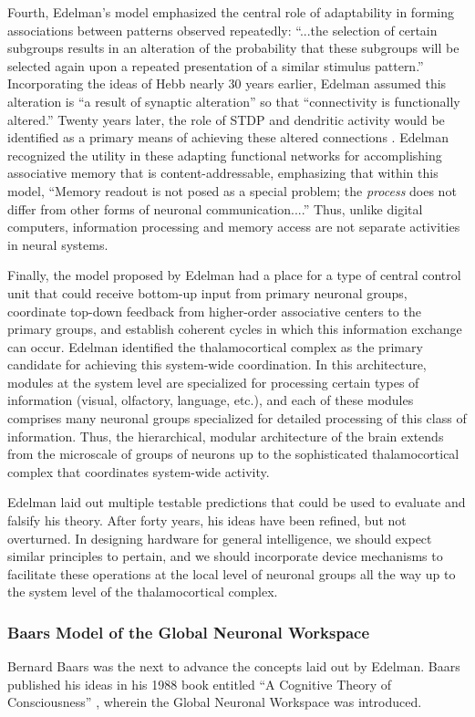 Fourth, Edelman's model emphasized the central role of adaptability in forming associations between patterns observed repeatedly: ``...the selection of certain subgroups results in an alteration of the probability that these subgroups will be selected again upon a repeated presentation of a similar stimulus pattern.'' Incorporating the ideas of Hebb nearly 30 years earlier, Edelman assumed this alteration is ``a result of synaptic alteration'' so that ``connectivity is functionally altered.'' Twenty years later, the role of STDP and dendritic activity would be identified as a primary means of achieving these altered connections \cite{bipo1998,pome2001}. Edelman recognized the utility in these adapting functional networks for accomplishing associative memory that is content-addressable, emphasizing that within this model, ``Memory readout is not posed as a special problem; the \textit{process} does not differ from other forms of neuronal communication....'' Thus, unlike digital computers, information processing and memory access are not separate activities in neural systems.

Finally, the model proposed by Edelman had a place for a type of central control unit that could receive bottom-up input from primary neuronal groups, coordinate top-down feedback from higher-order associative centers to the primary groups, and establish coherent cycles in which this information exchange can occur. Edelman identified the thalamocortical complex as the primary candidate for achieving this system-wide coordination. In this architecture, modules at the system level are specialized for processing certain types of information (visual, olfactory, language, etc.), and each of these modules comprises many neuronal groups specialized for detailed  processing of this class of information. Thus, the hierarchical, modular architecture of the brain extends from the microscale of groups of neurons up to the sophisticated thalamocortical complex that coordinates system-wide activity. 

Edelman laid out multiple testable predictions that could be used to evaluate and falsify his theory. After forty years, his ideas have been refined, but not overturned. In designing hardware for general intelligence, we should expect similar principles to pertain, and we should incorporate device mechanisms to facilitate these operations at the local level of neuronal groups all the way up to the system level of the thalamocortical complex.

\subsubsection{Baars Model of the Global Neuronal Workspace}
Bernard Baars was the next to advance the concepts laid out by Edelman. Baars published his ideas in his 1988 book entitled ``A Cognitive Theory of Consciousness'' \cite{ba1988}, wherein the Global Neuronal Workspace was introduced.

